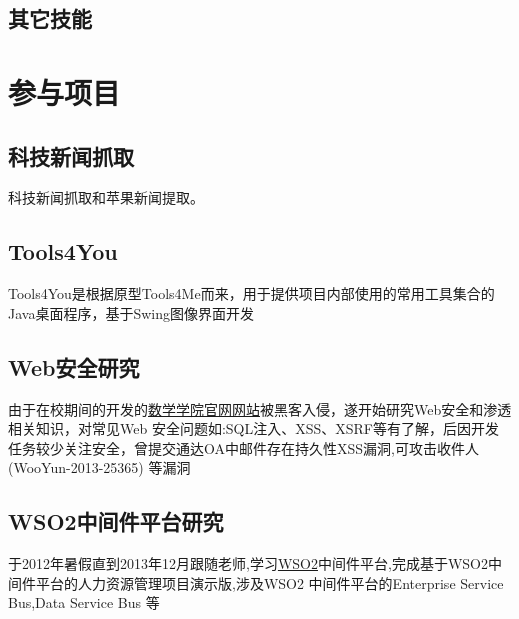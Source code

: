\documentclass[11pt,a4paper,kai]{moderncv}   %
\begin{document}
\begin{CJK}{UTF8}{kai}
\subsection{其它技能}

\section{参与项目}
\subsection{科技新闻抓取}
科技新闻抓取和苹果新闻提取。
\subsection{Tools4You}
 Tools4You是根据原型Tools4Me而来，用于提供项目内部使用的常用工具集合的Java桌面程序，基于Swing图像界面开发
\subsection{Web安全研究}
 由于在校期间的开发的\href{http://www.math.uestc.edu.cn}{数学学院官网网站}被黑客入侵，遂开始研究Web安全和渗透相关知识，对常见Web 安全问题如:SQL注入、XSS、XSRF等有了解，后因开发任务较少关注安全，曾提交通达OA中邮件存在持久性XSS漏洞,可攻击收件人(WooYun-2013-25365) 等漏洞
\subsection{WSO2中间件平台研究}
于2012年暑假直到2013年12月跟随老师,学习\href{www.wso2.com}{WSO2}中间件平台,完成基于WSO2中间件平台的人力资源管理项目演示版,涉及WSO2 中间件平台的Enterprise Service Bus,Data Service Bus 等


\renewcommand{\listitemsymbol}{-}             %



\end{CJK}
\end{document}
